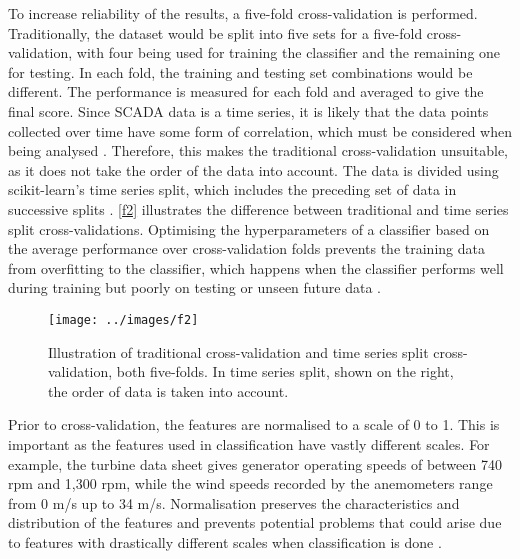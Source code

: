 To increase reliability of the results, a five-fold cross-validation is
performed. Traditionally, the dataset would be split into five sets for a
five-fold cross-validation, with four being used for training the classifier
and the remaining one for testing. In each fold, the training and testing set
combinations would be different. The performance is measured for each fold and
averaged to give the final score. Since SCADA data is a time series, it is
likely that the data points collected over time have some form of correlation,
which must be considered when being analysed \cite{64I}. Therefore, this makes
the traditional cross-validation unsuitable, as it does not take the order of
the data into account. The data is divided using scikit-learn's time series
split, which includes the preceding set of data in successive splits
\cite{31C}. \autoref{f2} illustrates the difference between traditional and
time series split cross-validations. Optimising the hyperparameters of a
classifier based on the average performance over cross-validation folds
prevents the training data from overfitting to the classifier, which happens
when the classifier performs well during training but poorly on testing or
unseen future data \cite{Puget16,Liang16}.

\begin{figure}
  \centering
  \texttt{[image: ../images/f2]}
  \caption{\label{f2}Illustration of traditional cross-validation and time
  series split cross-validation, both five-folds. In time series split, shown
  on the right, the order of data is taken into account.}
\end{figure}

Prior to cross-validation, the features are normalised \cite{43P} to a scale
of 0 to 1. This is important as the features used in classification have
vastly different scales. For example, the turbine data sheet gives generator
operating speeds of between 740 rpm and 1,300 rpm, while the wind speeds
recorded by the anemometers range from 0 m/s up to 34 m/s. Normalisation
preserves the characteristics and distribution of the features and prevents
potential problems that could arise due to features with drastically different
scales when classification is done \cite{Norma17}.


